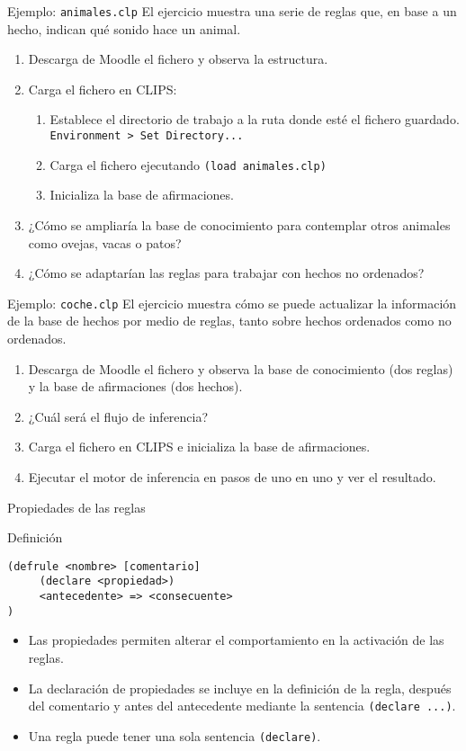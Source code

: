 \documentclass[usenames,dvipsnames,aspectratio=169]{beamer}
\begin{document}
\begin{frame}{Ejemplo: \texttt{animales.clp}}
	El ejercicio muestra una serie de reglas que, en base a un hecho, indican qué sonido hace un animal.
	\begin{enumerate}
		\item Descarga de Moodle el fichero y observa la estructura.
		\item Carga el fichero en CLIPS:
		\begin{enumerate}
			\item Establece el directorio de trabajo a la ruta donde esté el fichero guardado. \texttt{Environment > Set Directory...}
			\item Carga el fichero ejecutando \texttt{(load animales.clp)}
			\item Inicializa la base de afirmaciones.
		\end{enumerate}
		\item ¿Cómo se ampliaría la base de conocimiento para contemplar otros animales como ovejas, vacas o patos?
		\item ¿Cómo se adaptarían las reglas para trabajar con hechos no ordenados?
	\end{enumerate}
\end{frame}

\begin{frame}{Ejemplo: \texttt{coche.clp}}
	El ejercicio muestra cómo se puede actualizar la información de la base de hechos por medio de reglas, tanto sobre hechos ordenados como no ordenados.
	\begin{enumerate}
		\item Descarga de Moodle el fichero y observa la base de conocimiento (dos reglas) y la base de afirmaciones (dos hechos).
		\item ¿Cuál será el flujo de inferencia?
		\item Carga el fichero en CLIPS e inicializa la base de afirmaciones.
		\item Ejecutar el motor de inferencia en pasos de uno en uno y ver el resultado.
	\end{enumerate}
\end{frame}

\begin{frame}[fragile]{Propiedades de las reglas}
	\begin{block}{Definición}
\begin{verbatim}
(defrule <nombre> [comentario]
     (declare <propiedad>)
     <antecedente> => <consecuente>
)
\end{verbatim}
	\end{block}
	\begin{itemize}
		\item Las propiedades permiten alterar el comportamiento en la activación de las reglas.
		\item La declaración de propiedades se incluye en la definición de la regla, después del comentario y antes del antecedente mediante la sentencia \texttt{(declare ...)}.
		\item Una regla puede tener una sola sentencia \texttt{(declare)}.
	\end{itemize}
\end{frame}
\end{document}
